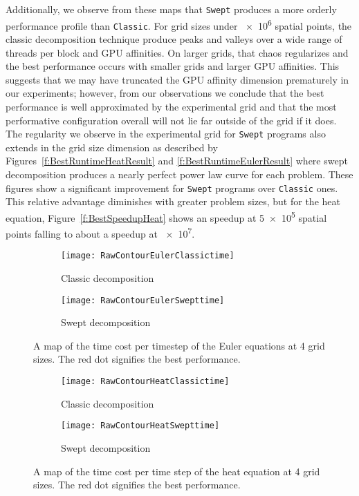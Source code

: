 Additionally, we observe from these maps that \texttt{Swept} produces a more orderly performance profile than \texttt{Classic}.
For grid sizes under \num{e6} spatial points, the classic decomposition technique produce peaks and valleys over a wide range of threads per block and GPU affinities.
On larger grids, that chaos regularizes and the best performance occurs with smaller grids and larger GPU affinities.
This suggests that we may have truncated the GPU affinity dimension prematurely in our experiments; however, from our observations we conclude that the best performance is well approximated by the experimental grid and that the most performative configuration overall will not lie far outside of the grid if it does.
The regularity we observe in the experimental grid for \texttt{Swept} programs also extends in the grid size dimension as described by Figures~\ref{f:BestRuntimeHeatResult} and \ref{f:BestRuntimeEulerResult} where swept decomposition produces a nearly perfect power law curve for each problem.
These figures show a significant improvement for \texttt{Swept} programs over \texttt{Classic} ones.
This relative advantage diminishes with greater problem sizes, but for the heat equation,  Figure~\ref{f:BestSpeedupHeat} shows an  speedup at \num{5e5} spatial points falling to about a  speedup at \num{e7}.

\begin{figure}[htbp]
    \centering
    \begin{subfigure}[t]{.75\textwidth}
        \centering
        \texttt{[image: RawContourEulerClassictime]}
        \caption{Classic decomposition}
        \label{f:EulerContourC}
    \end{subfigure}
    \begin{subfigure}[!tb]{.75\textwidth}
        \centering
        \texttt{[image: RawContourEulerSwepttime]}
        \caption{Swept decomposition}
        \label{f:EulerContourS}
    \end{subfigure}
    \caption{A map of the time cost per timestep of the Euler equations at 4 grid sizes.
    The red dot signifies the best performance.}
    \label{f:EulerContours}
\end{figure}

\begin{figure}[htbp]
    \centering
    \begin{subfigure}[t]{.75\textwidth}
        \centering
        \texttt{[image: RawContourHeatClassictime]}
        \caption{Classic decomposition}
        \label{f:HeatContourC}
    \end{subfigure}
    \begin{subfigure}[!tb]{.75\textwidth}
        \centering
        \texttt{[image: RawContourHeatSwepttime]}
        \caption{Swept decomposition}
        \label{f:HeatContourS}
    \end{subfigure}
    \caption{A map of the time cost per time step of the heat equation at 4 grid sizes.
    The red dot signifies the best performance.}
    \label{f:HeatContours}
\end{figure}

